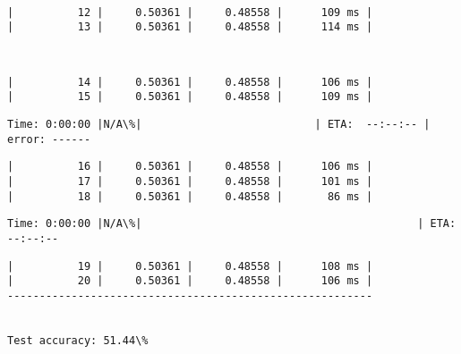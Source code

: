 \documentclass[11pt]{article}
\begin{document}
    \begin{Verbatim}[commandchars=\\\{\}]
                                                                               

    \end{Verbatim}

    \begin{Verbatim}[commandchars=\\\{\}]
|          12 |     0.50361 |     0.48558 |      109 ms |
|          13 |     0.50361 |     0.48558 |      114 ms |

    \end{Verbatim}

    \begin{Verbatim}[commandchars=\\\{\}]
                                                                               

    \end{Verbatim}

    \begin{Verbatim}[commandchars=\\\{\}]
|          14 |     0.50361 |     0.48558 |      106 ms |
|          15 |     0.50361 |     0.48558 |      109 ms |

    \end{Verbatim}

    \begin{Verbatim}[commandchars=\\\{\}]
Time: 0:00:00 |N/A\%|                           | ETA:  --:--:-- | error: ------
    \end{Verbatim}

    \begin{Verbatim}[commandchars=\\\{\}]
|          16 |     0.50361 |     0.48558 |      106 ms |
|          17 |     0.50361 |     0.48558 |      101 ms |
|          18 |     0.50361 |     0.48558 |       86 ms |

    \end{Verbatim}

    \begin{Verbatim}[commandchars=\\\{\}]
Time: 0:00:00 |N/A\%|                                           | ETA:  --:--:--
    \end{Verbatim}

    \begin{Verbatim}[commandchars=\\\{\}]
|          19 |     0.50361 |     0.48558 |      108 ms |
|          20 |     0.50361 |     0.48558 |      106 ms |
---------------------------------------------------------


Test accuracy: 51.44\%

    \end{Verbatim}
\end{document}
